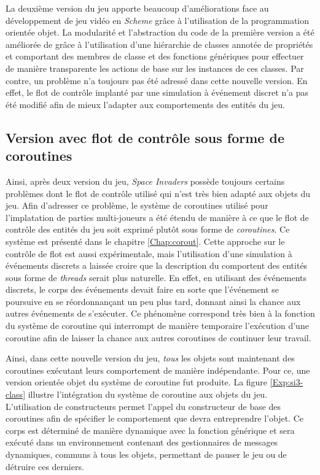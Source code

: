 \documentclass[12pt,twoside,letterpaper,francais]{book}
\newcommand{\si}{{\textit{Space Invaders }}}
\newcommand{\Schemelang}{{\textit{Scheme }}}
\newcommand{\scheme}[1]{\selectlanguage{english}{\tt #1}\selectlanguage{french}}
\begin{document}
La deuxième version du jeu apporte beaucoup d'améliorations face au
développement de jeu vidéo en \Schemelang grâce à l'utilisation de la
programmation orientée objet. La modularité et l'abstraction du code
de la première version a été améliorée de grâce à l'utilisation d'une
hiérarchie de classes annotée de propriétés et comportant des membres
de classe et des fonctions génériques pour effectuer de manière
transparente les actions de base sur les instances de ces classes. Par
contre, un problème n'a toujours pas été adressé dans cette nouvelle
version. En effet, le flot de contrôle implanté par une simulation à
événement discret n'a pas été modifié afin de mieux l'adapter aux
comportements des entités du jeu.


\FloatBarrier
\subsection{Version avec flot de contrôle sous forme de coroutines} \label{Exp:sp3}
Ainsi, après deux version du jeu, \si possède toujours certains
problèmes dont le flot de contrôle utilisé qui n'est très bien adapté
aux objets du jeu. Afin d'adresser ce problème, le système de
coroutines utilisé pour l'implatation de parties multi-joueurs a été
étendu de manière à ce que le flot de contrôle des entités du jeu soit
exprimé plutôt sous forme de \emph{coroutines}. Ce système est
présenté dans le chapitre \ref{Chap:corout}. Cette approche sur le
contrôle de flot est aussi expérimentale, mais l'utilisation d'une
simulation à événements discrets a laissée croire que la description
du comportent des entités sous forme de \textit{threads} serait plus
naturelle. En effet, en utilisant des événements discrets, le corps
des événements devait faire en sorte que l'événement se poursuive en
se réordonnançant un peu plus tard, donnant ainsi la chance aux autres
événements de s'exécuter. Ce phénomène correspond très bien à la
fonction \scheme{yield} du système de coroutine qui interrompt de
manière temporaire l'exécution d'une coroutine afin de laisser la
chance aux autres coroutines de continuer leur travail.

Ainsi, dans cette nouvelle version du jeu, \emph{tous} les objets sont
maintenant des coroutines exécutant leurs comportement de manière
indépendante. Pour ce, une version orientée objet du système de
coroutine fut produite. La figure \ref{Exp:si3-class} illustre
l'intégration du système de coroutine aux objets du jeu. L'utilisation
de constructeurs permet l'appel du constructeur de base des coroutines
afin de spécifier le comportement que devra entreprendre l'objet. Ce
corps est déterminé de manière dynamique avec la fonction générique
\scheme{behaviour} et sera exécuté dans un environnement contenant des
gestionnaires de messages dynamiques, communs à tous les objets,
permettant de pauser le jeu ou de détruire ces derniers.
\end{document}
